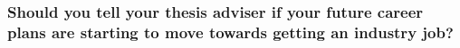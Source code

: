 \documentclass[12pt]{beamer}
\begin{document}
\begin{frame}
  \frametitle{ Should you tell your thesis adviser if your future career plans are starting to move towards getting an industry job?}
  










\end{frame}
\end{document}
